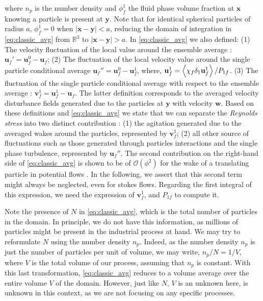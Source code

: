 where $n_p$ is the number density and $\phi_f^1$ the fluid phase volume fraction at $\textbf{x}$ knowing a particle is present at $\textbf{y}$. 
Note that for identical spherical particles of radius $a$, $\phi_f^1 = 0$ when $|\textbf{x}-\textbf{y}| < a$, reducing the domain of integration in \ref{eq:classic_avg} from $\mathbb{R}^3$ to $|\textbf{x}-\textbf{y}| > a$. 
In \ref{eq:classic_avg} we also defined: 
(1) The velocity fluctuation of the local value around the ensemble average : $\textbf{u}_f' = \textbf{u}_f^0 - \textbf{u}_f$;
(2) The fluctuation of the local velocity value around the single particle conditional average $\textbf{u}_f'' = \textbf{u}_f^0 - \textbf{u}_f^1$, where, $\textbf{u}_f^1 =\left<\chi_f \delta_1 \textbf{u}_f^1\right>/P_{1f}$.  
(3) The fluctuation of the single particle conditional average with respect to the ensemble average : $\textbf{v}_f^{1} = \textbf{u}_f^1 - \textbf{u}_f$.
The latter definition corresponds to the averaged velocity disturbance fields generated due to the particles at $\textbf{y}$ with velocity $\textbf{w}$. 
Based on these definitions and \ref{eq:classic_avg} we state that we can separate the \textit{Reynolds stress} into two distinct contribution :  (1) the agitation generated due to the averaged wakes around the particles, represented by $\textbf{v}_f^{1}$; (2) all other source of fluctuations such as those generated through particles interactions and the single phase turbulence, represented by $\textbf{u}_f''$. 
The second contribution on the right-hand side of \ref{eq:classic_avg} is shown to be of $\mathcal{O}(\phi^2)$ for the wake of a translating particle in potential flows \citet[Appendix A]{zhang1994averaged}.
In the following, we assert that this second term might always be neglected, even for stokes flows. 
Regarding the first integral of this expression, we need the expression of $\textbf{v}_f^{1}$, and $P_{1f}$ to compute it.

Note the presence of $N$ in \ref{eq:classic_avg}, which is the total number of particles in the domain. 
In principle, we do not have this information, as millions of particles might be present in the industrial process at hand. 
We may try to reformulate $N$ using the number density $n_p$. 
Indeed, as the number density $n_p$ is just the number of particles per unit of volume, we may write, $n_p / N = 1/V$, where $V$ is the total volume of our process, assuming that $n_p$ is constant. 
With this last transformation, \ref{eq:classic_avg} reduces to a volume average over the entire volume $V$ of the domain. 
However, just like $N$, $V$ is an unknown here, is unknown in this context, as we are not focusing on any specific processes. 


